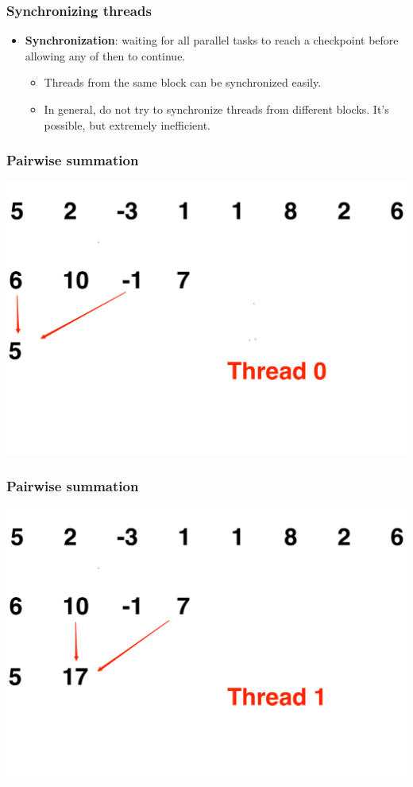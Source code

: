 \documentclass[handout]{beamer}
\numberwithin{equation}{section}
\begin{document}
\begin{frame}
\frametitle{Synchronizing threads}
\begin{itemize}
\item {\bf Synchronization}: waiting for all parallel tasks to reach a checkpoint before allowing any of then to continue.
\begin{itemize}
\pause \item Threads from the same block can be synchronized easily.
\pause \item In general, do not try to synchronize threads from different blocks. It's possible, but extremely inefficient.
\end{itemize}
\end{itemize}
\end{frame}


\begin{frame}
\frametitle{Pairwise summation}
\includegraphics[scale=.25]{../../fig/psum6.pdf}
\end{frame}

\begin{frame}
\frametitle{Pairwise summation}
\includegraphics[scale=.25]{../../fig/psum7.pdf}
\end{frame}
\end{document}
